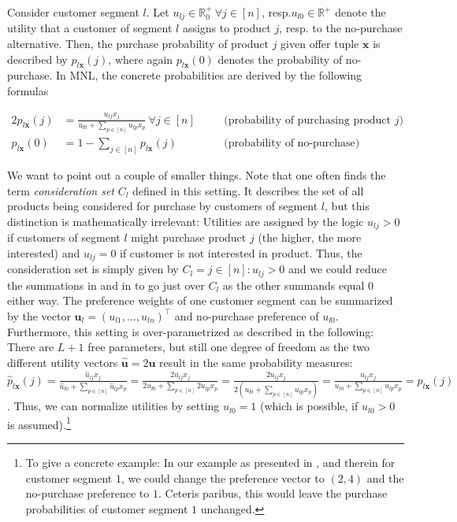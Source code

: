 Consider customer segment $l$. Let $u_{lj} \in \mathbb{R}^+_0 ~\forall j \in [n]$, resp.\xspace $u_{l0} \in \mathbb{R}^+$ denote the utility that a customer of segment $l$ assigns to product $j$, resp.\xspace to the no-purchase alternative. Then, the purchase probability of product $j$ given offer tuple $\boldsymbol{x}$ is described by $p_{l\boldsymbol{x}}(j)$, where again $p_{l\boldsymbol{x}}(0)$ denotes the probability of no-purchase. In MNL, the concrete probabilities are derived by the following formulas

\begin{alignat}{2}
	p_{l\boldsymbol{x}}(j) &= \frac{u_{lj}x_j}{u_{l0} + \sum_{p\in[n]} u_{lp}x_p} ~\forall j \in [n]\quad  && \text{(probability of purchasing product $j$)}\label{eq:DCM1}\\
	p_{l\boldsymbol{x}}(0) &= 1 - \sum_{j\in[n]}p_{l\boldsymbol{x}}(j) && \text{(probability of no-purchase)}\label{eq:DCM2}
\end{alignat} 

We want to point out a couple of smaller things. Note that one often finds the term \emph{consideration set} $C_l$ defined in this setting. It describes the set of all products being considered for purchase by customers of segment $l$, but this distinction is mathematically irrelevant: Utilities are assigned by the logic  $u_{lj} > 0$ if customers of segment $l$ might purchase product $j$ (the higher, the more interested) and $u_{lj} = 0$ if customer is not interested in product. Thus, the consideration set is simply given by $C_l = {j \in [n] : u_{lj} > 0}$ and we could reduce the summations in  and in  to go just over $C_l$ as the other summands equal $0$ either way. 
The preference weights of one customer segment can be summarized by the vector $\boldsymbol{u}_l = (u_{l1}, \dots, u_{ln})^\intercal$ and no-purchase preference of $u_{l0}$. Furthermore, this setting is over-parametrized as described in the following: There are $L+1$ free parameters, but still one degree of freedom as the two different utility vectors $\hat{\boldsymbol{u}} = 2\boldsymbol{u}$ result in the same probability measures: $\hat{p}_{l\boldsymbol{x}}(j) = \frac{\hat{u}_{lj}x_j}{\hat{u}_{l0} + \sum_{p\in[n]} \hat{u}_{lp}x_p} = \frac{2u_{lj}x_j}{2u_{l0} + \sum_{p\in[n]} 2u_{lp}x_p} = \frac{2u_{lj}x_j}{2\left(u_{l0} + \sum_{p\in[n]} u_{lp}x_p\right)} = \frac{u_{lj}x_j}{u_{l0} + \sum_{p\in[n]} u_{lp}x_p} =  p_{l\boldsymbol{x}}(j)$ . Thus, we can normalize utilities by \eg setting $u_{l0} = 1$ (which is possible, if $u_{l0} > 0$ is assumed).\footnote{To give a concrete example: In our example as presented in , and therein for customer segment $1$, we could change the preference vector to $(2, 4)$ and the no-purchase preference to $1$. Ceteris paribus, this would leave the purchase probabilities of customer segment $1$ unchanged.}

